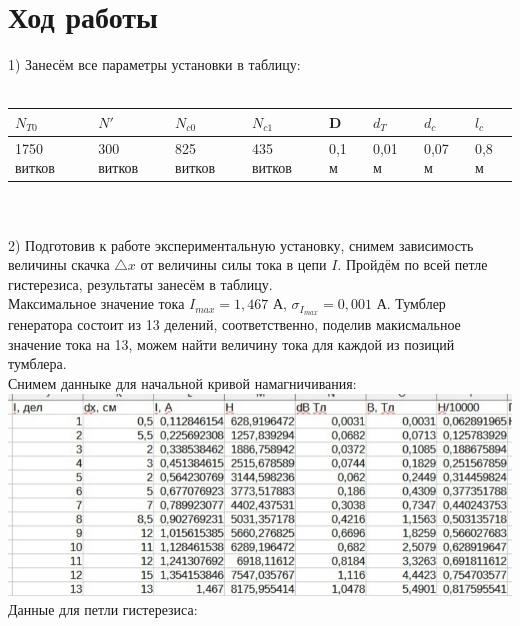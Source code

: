 \documentclass[11pt]{article}
\begin{document}
\section{Ход работы}
1) Занесём все параметры установки в таблицу:\\
\\
\begin{tabular}{|l|l|l|l|l|l|l|l|}
\hline
$N_{T0}$ & $N'$ & $N_{c0}$ & $N_{c1}$ & D & $d_{T}$ & $d_{c}$ & $l_{c}$ \\
\hline
1750 витков & 300 витков & 825 витков & 435 витков & 0,1 м & 0,01 м & 0,07 м & 0,8 м\\
\hline
\end{tabular}\\
\\
2) Подготовив к работе экспериментальную установку, снимем зависимость величины скачка $\triangle x$ от величины силы тока в цепи $I$. Пройдём по всей петле гистерезиса, результаты занесём в таблицу.\\
Максимальное значение тока $I_{max} = 1,467$ А, $\sigma_{I_{max}} = 0,001$ А. Тумблер генератора состоит из 13 делений, соответственно, поделив макисмальное значение тока на 13, можем найти величину тока для каждой из позиций тумблера.\\
Снимем данныке для начальной кривой намагничивания:\\
\includegraphics[width=16cm]{g9}\\
Данные для петли гистерезиса:\\
\end{document}
